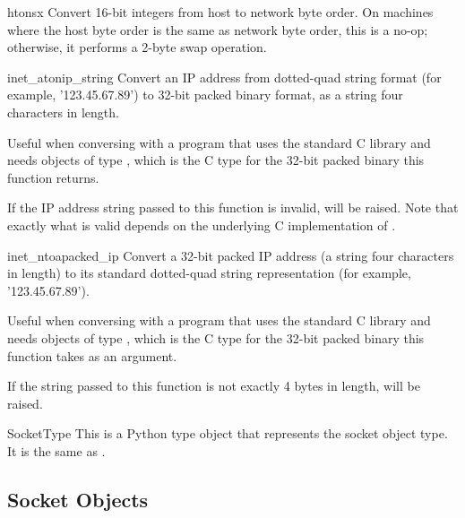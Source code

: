 \begin{funcdesc}{htons}{x}
Convert 16-bit integers from host to network byte order.  On machines
where the host byte order is the same as network byte order, this is a
no-op; otherwise, it performs a 2-byte swap operation.
\end{funcdesc}

\begin{funcdesc}{inet_aton}{ip_string}
Convert an IP address from dotted-quad string format (for example,
'123.45.67.89') to 32-bit packed binary format, as a string four
characters in length.

Useful when conversing with a program that uses the standard C library
and needs objects of type , which is the C type
for the 32-bit packed binary this function returns.

If the IP address string passed to this function is invalid,
 will be raised. Note that exactly what is
valid depends on the underlying C implementation of
.
\end{funcdesc}

\begin{funcdesc}{inet_ntoa}{packed_ip}
Convert a 32-bit packed IP address (a string four characters in
length) to its standard dotted-quad string representation
(for example, '123.45.67.89').

Useful when conversing with a program that uses the standard C library
and needs objects of type , which is the C type
for the 32-bit packed binary this function takes as an argument.

If the string passed to this function is not exactly 4 bytes in
length,  will be raised.
\end{funcdesc}

\begin{datadesc}{SocketType}
This is a Python type object that represents the socket object type.
It is the same as .
\end{datadesc}


\begin{seealso}
\end{seealso}


\subsection{Socket Objects \label{socket-objects}}

